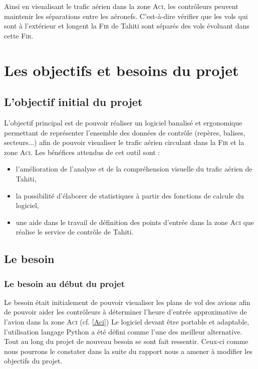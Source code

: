 Ainsi en visualisant le trafic aérien dans la zone \textsc{Aci}, les contrôleurs peuvent maintenir les séparations entre les aéronefs. C'est-à-dire vérifier que les vols qui sont à l’extérieur et longent la \textsc{Fir} de Tahiti sont séparés des vols évoluant dans cette \textsc{Fir}.

\section{Les objectifs et besoins du projet}
    \subsection{L'objectif initial du projet}
L’objectif principal est de pouvoir réaliser un logiciel banalisé et ergonomique permettant de
représenter l’ensemble des données de contrôle (repères, balises, secteurs...) afin de pouvoir
visualiser le trafic aérien circulant dans la \textsc{Fir} et la zone \textsc{Aci}.
Les bénéfices attendus de cet outil sont :
\begin{itemize}
\item l’amélioration de l’analyse et de la compréhension visuelle du trafic aérien de Tahiti,
\item la possibilité d’élaborer de statistiques à partir des fonctions de calcule du logiciel,
\item une aide dans le travail de définition des points d’entrée dans la zone \textsc{Aci} que réalise le
service de contrôle de Tahiti.
\end{itemize}

    \subsection{Le besoin}
        \subsubsection{Le besoin au début du projet}
Le besoin était initialement de pouvoir visualiser les plans de vol des avions afin de pouvoir aider les contrôleurs à déterminer l'heure d'entrée approximative de l'avion dans la zone \textsc{Aci} (cf. \vref{Aci})
Le logiciel devant être portable et adaptable, l'utilisation langage Python a été défini comme l'une des meilleur alternative.
Tout au long du projet de nouveau besoin se sont fait ressentir. Ceux-ci comme nous pourrons le constater dans la suite du rapport nous a amener à modifier les objectifs du projet.

